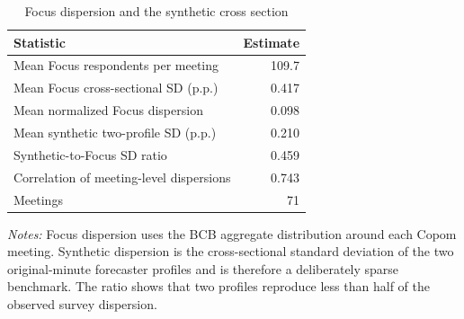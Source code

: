 \begin{table}[htbp]
\color{revisionred}
\centering
\begin{threeparttable}
\caption{Focus dispersion and the synthetic cross section}
\label{tab:focus-dispersion}
\begin{footnotesize}
\begin{tabular}{ld}
\toprule
Statistic & Estimate \\
\midrule
Mean Focus respondents per meeting & 109.7 \\
Mean Focus cross-sectional SD (p.p.) & 0.417 \\
Mean normalized Focus dispersion & 0.098 \\
Mean synthetic two-profile SD (p.p.) & 0.210 \\
Synthetic-to-Focus SD ratio & 0.459 \\
Correlation of meeting-level dispersions & 0.743 \\
Meetings & 71 \\
\bottomrule
\end{tabular}
\begin{tablenotes}[flushleft]
\scriptsize
\item \textit{Notes:} Focus dispersion uses the BCB aggregate distribution around each Copom meeting. Synthetic dispersion is the cross-sectional standard deviation of the two original-minute forecaster profiles and is therefore a deliberately sparse benchmark. The ratio shows that two profiles reproduce less than half of the observed survey dispersion.
\end{tablenotes}
\end{footnotesize}
\end{threeparttable}
\end{table}
